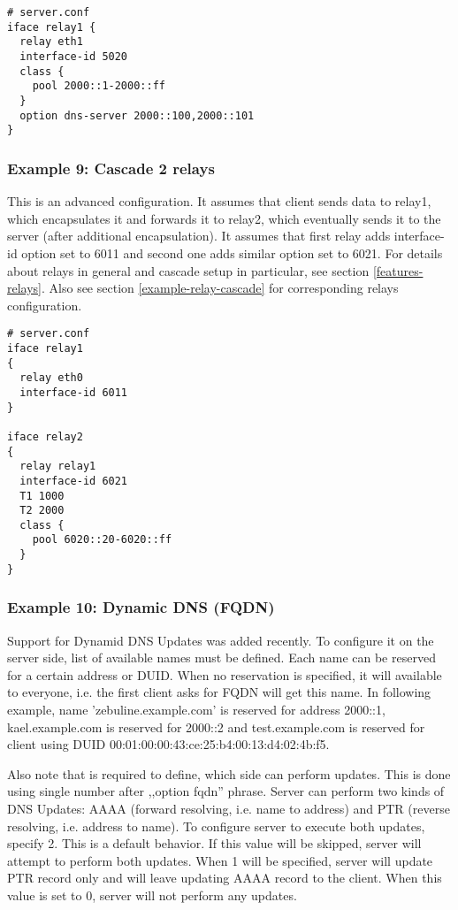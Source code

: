\begin{lstlisting}
# server.conf
iface relay1 {
  relay eth1
  interface-id 5020
  class {
    pool 2000::1-2000::ff
  }
  option dns-server 2000::100,2000::101
}
\end{lstlisting}

\subsubsection{Example 9: Cascade 2 relays}
\label{example-server-relay2}
This is an advanced configuration. It assumes that client sends data to
relay1, which encapsulates it and forwards it to relay2, which
eventually sends it to the server (after additional encapsulation). It
assumes that first relay adds interface-id option set to 6011 and
second one adds similar option set to 6021. For details about relays
in general and cascade setup in particular, see section
\ref{features-relays}. Also see section \ref{example-relay-cascade}
for corresponding relays configuration.

\begin{lstlisting}
# server.conf
iface relay1
{
  relay eth0
  interface-id 6011
} 

iface relay2
{
  relay relay1
  interface-id 6021
  T1 1000
  T2 2000
  class {
    pool 6020::20-6020::ff
  }
}
\end{lstlisting}

\subsubsection{Example 10: Dynamic DNS (FQDN)}
\label{example-server-fqdn}

Support for Dynamid DNS Updates was added recently. To configure it
on the server side, list of available names must be defined. Each name
can be reserved for a certain address or DUID. When no reservation is
specified, it will available to everyone, i.e. the first client asks
for FQDN will get this name. In following example, name 'zebuline.example.com' is
reserved for address 2000::1, kael.example.com is reserved for 2000::2 and
test.example.com is reserved for client using DUID
00:01:00:00:43:ce:25:b4:00:13:d4:02:4b:f5. 

Also note that is required to define, which side can perform updates.
This is done using single number after ,,option fqdn'' phrase. Server
can perform two kinds of DNS Updates: AAAA (forward resolving,
i.e. name to address) and PTR (reverse resolving, i.e. address to
name). To configure server to execute both updates, specify 2. This is
a default behavior. If this value will be skipped, server will attempt
to perform both updates. When 1 will be specified, server will update
PTR record only and will leave updating AAAA record to the
client. When this value is set to 0, server will not perform any
updates.

